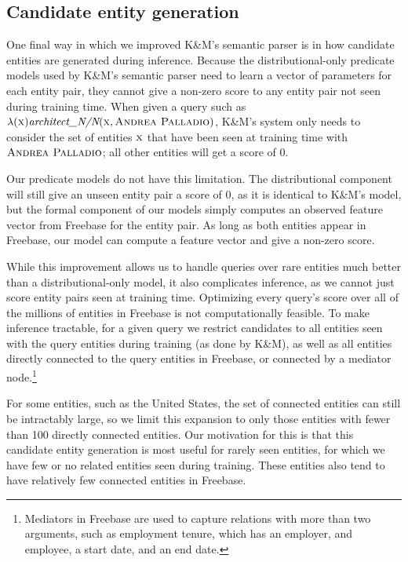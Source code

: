 \documentclass[11pt]{article}
\newcommand{\lexicalpredicate}[1]{\ensuremath{\textit{#1}}}
\newcommand{\entity}[1]{\ensuremath{\textsc{#1}}}
\begin{document}
\subsection{Candidate entity generation}
\label{sec:better-candidates}

One final way in which we improved K\&M's semantic parser is in how candidate
entities are generated during inference.  Because the distributional-only
predicate models used by K\&M's semantic parser need to learn a vector of
parameters for each entity pair, they cannot give a non-zero score to any
entity pair not seen during training time.  When given a query such as
$\lambda(\entity{x}) \lexicalpredicate{architect\_N/N}(\entity{x}, \entity{Andrea
Palladio})$, K\&M's system only needs to consider the set of entities
$\entity{x}$ that have been seen at training time with \entity{Andrea
Palladio}; all other entities will get a score of 0.

Our predicate models do not have this limitation.  The distributional component
will still give an unseen entity pair a score of 0, as it is identical to K\&M's
model, but the formal component of our models simply computes an observed
feature vector from Freebase for the entity pair.  As long as both entities
appear in Freebase, our model can compute a feature vector and give a non-zero
score.

While this improvement allows us to handle queries over rare entities much
better than a distributional-only model, it also complicates inference, as we
cannot just score entity pairs seen at training time.  Optimizing every query's
score over all of the millions of entities in Freebase is not computationally
feasible.  To make inference tractable, for a given query we restrict
candidates to all entities seen with the query entities during training (as
done by K\&M), as well as all entities directly connected to the query entities
in Freebase, or connected by a mediator node.\footnote{Mediators in Freebase are
used to capture relations with more than two arguments, such as employment
tenure, which has an employer, and employee, a start date, and an end date.}

For some entities, such as the United States, the set of connected entities can
still be intractably large, so we limit this expansion to only those entities
with fewer than 100 directly connected entities.  Our motivation for this is
that this candidate entity generation is most useful for rarely seen entities,
for which we have few or no related entities seen during training.  These
entities also tend to have relatively few connected entities in Freebase.
\end{document}
